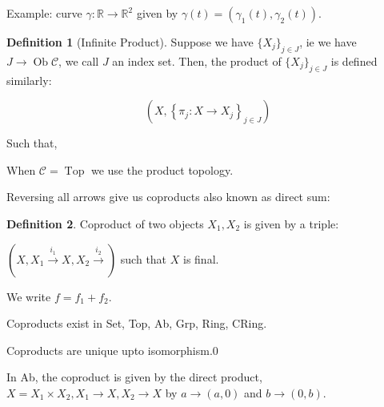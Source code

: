 \documentclass{article}
\theoremstyle{definition}
\newtheorem*{definition}{Definition}
\begin{document}
    Example: curve \(\gamma: \mathbb{R} \to \mathbb{R}^2\) given by \(\gamma(t) = (\gamma_1(t),\gamma_2(t))\).
    
    \begin{definition}
        [Infinite Product] Suppose we have \(\{ X_j \}_{j\in J}\), ie we have \(J \to \operatorname{Ob} \mathcal{C}\), we call \(J\) an index set. Then, the product of \(\{ X_j \}_{j\in J}\) is defined similarly:

        \[
            \left( X, \left\{ \pi_j : X \to X_j \right\}_{j\in J} \right) 
        \]

        Such that,

        \begin{center}
        \end{center}
    \end{definition}

    When \(\mathcal{C} = \operatorname{Top}\) we use the product topology.

    Reversing all arrows give us coproducts also known as direct sum:

    \begin{definition}
        Coproduct of two objects \(X_1, X_2\) is given by a triple:
        
        \(\left( X, X_1 \xrightarrow{i_1} X, X_2\xrightarrow{i_2} \right)\) such that \(X\) is final.

        \begin{center}
        \end{center}

        We write \(f = f_1 + f_2\).

        Coproducts exist in Set, Top, Ab, Grp, Ring, CRing.

        Coproducts are unique upto isomorphism.0
    \end{definition}

    In Ab, the coproduct is given by the direct product, \(X = X_1 \times X_2, X_1 \to X, X_2 \to X\) by \(a \to (a,0)\) and \(b \to (0,b)\).
\end{document}
